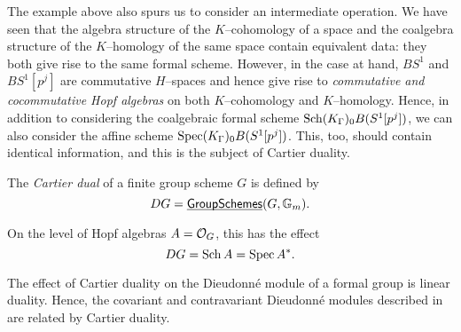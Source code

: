 The example above also spurs us to consider an intermediate operation.  We have seen that the algebra structure of the $K$--cohomology of a space and the coalgebra structure of the $K$--homology of the same space contain equivalent data: they both give rise to the same formal scheme.  However, in the case at hand, $BS^1$ and $BS^1[p^j]$ are commutative $H$--spaces and hence give rise to \emph{commutative and cocommutative Hopf algebras} on both $K$--cohomology and $K$--homology.  Hence, in addition to considering the coalgebraic formal scheme $\operatorname{Sch} (K_\Gamma)_0 B(S^1[p^j])$, we can also consider the affine scheme $\operatorname{Spec} (K_\Gamma)_0 B(S^1[p^j])$.  This, too, should contain identical information, and this is the subject of Cartier duality.

\begin{definition}
The \textit{Cartier dual} of a finite group scheme $G$ is defined by \[DG = \operatorname{\underline{\smash{\mathsf{GroupSchemes}}}}(G, \mathbb G_m).\]
\end{definition}

\begin{lemma}
On the level of Hopf algebras $A = \mathcal{O}_G$, this has the effect \[DG = \Sch A = \Spec A^*. \qed\]
\end{lemma}


\begin{remark}
The effect of Cartier duality on the Dieudonn\'e module of a formal group is linear duality.  Hence, the covariant and contravariant Dieudonn\'e modules described in  are related by Cartier duality.
\end{remark}

